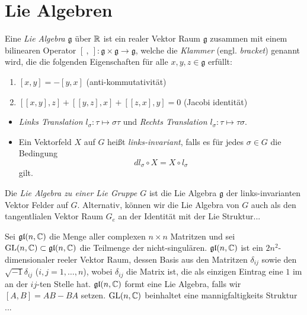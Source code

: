 \section{Lie Algebren}
\begin{defn}
Eine \emph{Lie Algebra} $\mathfrak g$ über $\mathbb{R}$ ist ein realer Vektor Raum
$\mathfrak g$ zusammen mit einem bilinearen Operator 
$[~,~]: \mathfrak g\times\mathfrak g\to\mathfrak g$, welche die \emph{Klammer}
(engl.  \emph{bracket}) genannt wird, die die folgenden Eigenschaften für alle
$x,y,z\in \mathfrak g$ erfüllt:
\begin{enumerate}
\item $[x,y]=-[y,x]$                    \hfill (anti-kommutativität)
\item $[[x,y],z]+[[y,z],x]+[[z,x],y]=0$ \hfill (Jacobi identität)
\end{enumerate}
\end{defn}
\begin{comment}
Allgemeiner? Über $\C$?
\end{comment}
\begin{defn} 
\begin{itemize}
\item 
\emph{Links Translation $l_\sigma:\tau \mapsto \sigma\tau$}
und 
\emph{Rechts Translation $l_\sigma:\tau \mapsto \tau\sigma$}.
\item 
Ein Vektorfeld $X$ auf $G$ heißt \emph{links-invariant}, falls es für jedes
$\sigma\in G$ die Bedingung
\[
dl_\sigma \circ X = X\circ l_\sigma
\]
 gilt.
\end{itemize}
\end{defn}
\begin{defn} 
Die \emph{Lie Algebra zu einer Lie Gruppe $G$} ist die Lie Algebra $\mathfrak
g$ der links-invarianten Vektor Felder auf $G$. Alternativ,
können wir die Lie Algebra von $G$ auch als den tangentlialen Vektor Raum $G_e$
an der Identität mit der Lie Struktur...
\end{defn}
\begin{exmp}
Sei $\mathfrak{gl}(n,\mathbb{C})$ die Menge aller complexen $n\times n$ Matritzen und
sei $\operatorname{GL}(n,\mathbb{C})\subset\mathfrak{gl}(n,\mathbb{C})$ die Teilmenge der nicht-singulären.
$\mathfrak{gl}(n,\mathbb{C})$ ist ein $2n^2$-dimensionaler reeler Vektor Raum, dessen
Basis aus den Matritzen $\delta_{ij}$ sowie den $\sqrt{-1}\delta_{ij}$
($i,j=1,\dots,n$), wobei $\delta_{ij}$ die Matrix ist, die als einzigen Eintrag
eine $1$ im an der $ij$-ten Stelle hat.
$\mathfrak{gl}(n,\mathbb{C})$ formt eine Lie Algebra, falls wir $[A,B]=AB-BA$ setzen.
$\operatorname{GL}(n,\mathbb{C})$ beinhaltet eine mannigfaltigkeits Struktur ...
\end{exmp}

